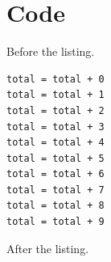 \documentclass{article}
\begin{document}
\section{Code}
Before the listing.
\begin{verbatim}
total = total + 0
total = total + 1
total = total + 2
total = total + 3
total = total + 4
total = total + 5
total = total + 6
total = total + 7
total = total + 8
total = total + 9
\end{verbatim}
After the listing.
\printindex
\end{document}
